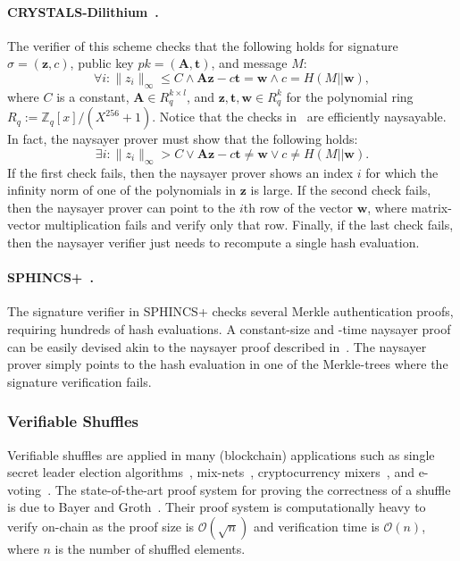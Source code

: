 \paragraph{CRYSTALS-Dilithium~\cite{TCHES:DKLLS18}.} The verifier of this scheme checks that the following holds for signature $\sigma=(\mathbf{z},c)$, public key $\mathit{pk}=(\mathbf{A},\mathbf{t})$, and message $M$:
\begin{equation}\label{eq:crystals_verifier_check}
    \forall i: \lVert z_i\rVert_{\infty}\leq C\land \mathbf{A}\mathbf{z}-c\mathbf{t} = \mathbf{w} \land c=H(M\vert\vert \mathbf{w}),
\end{equation}
where $C$ is a constant, $\mathbf{A}\in R^{k\times l}_q$, and $\mathbf{z},\mathbf{t},\mathbf{w}\in R^{k}_q$ for the polynomial ring $R_q:=\mathbb{Z}_q[x]/(X^{256}+1)$. Notice that the checks in~ are efficiently naysayable. In fact, the naysayer prover must show that the following holds: 
\begin{equation}\label{eq:crystals_naysayer_prover}
    \exists i: \lVert z_i\rVert_{\infty}>C\lor \mathbf{A}\mathbf{z}-c\mathbf{t} \neq \mathbf{w} \lor c\neq H(M\vert\vert \mathbf{w}).
\end{equation}
If the first check fails, then the naysayer prover shows an index $i$ for which the infinity norm of one of the polynomials in $\mathbf{z}$ is large. If the second check fails, then the naysayer prover can point to the $i$th row of the vector $\mathbf{w}$, where matrix-vector multiplication fails and verify only that row. Finally, if the last check fails, then the naysayer verifier just needs to recompute a single hash evaluation.

\paragraph{SPHINCS+~\cite{CCS:BHKNRS19}.} The signature verifier in SPHINCS+ checks several Merkle authentication proofs, requiring hundreds of hash evaluations. A constant-size and -time naysayer proof can be easily devised akin to the naysayer proof described in~. The naysayer prover simply points to the hash evaluation in one of the Merkle-trees where the signature verification fails. 

\subsubsection{Verifiable Shuffles}\label{sec:vshuffle_naysayer}
Verifiable shuffles are applied in many (blockchain) applications such as single secret leader election algorithms~\cite{AFT:Boneh20}, mix-nets~\cite{CACM:Chaum81}, cryptocurrency mixers~\cite{EPRINT:SNBB19}, and e-voting~\cite{USENIX:Adida08}. The state-of-the-art proof system for proving the correctness of a shuffle is due to Bayer and Groth~\cite{EC:BayGro12}. Their proof system is computationally heavy to verify on-chain as the proof size is $\mathcal{O}(\sqrt{n})$ and verification time is $\mathcal{O}(n)$, where $n$ is the number of shuffled elements. 

